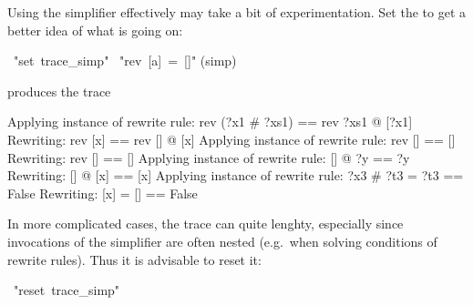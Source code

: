 \begin{isabelle}%
%
\begin{isamarkuptext}%
Using the simplifier effectively may take a bit of experimentation.  Set the
  to get a better idea of what is going
on:%
\end{isamarkuptext}%
~{"}set~trace\_simp{"}\isanewline
{}~{"}rev~[a]~=~[]{"}\isanewline
{}(simp)%
\begin{isamarkuptxt}%
\noindent
produces the trace

\begin{ttbox}
Applying instance of rewrite rule:
rev (?x1 \# ?xs1) == rev ?xs1 @ [?x1]
Rewriting:
rev [x] == rev [] @ [x]
Applying instance of rewrite rule:
rev [] == []
Rewriting:
rev [] == []
Applying instance of rewrite rule:
[] @ ?y == ?y
Rewriting:
[] @ [x] == [x]
Applying instance of rewrite rule:
?x3 \# ?t3 = ?t3 == False
Rewriting:
[x] = [] == False
\end{ttbox}

In more complicated cases, the trace can quite lenghty, especially since
invocations of the simplifier are often nested (e.g.\ when solving conditions
of rewrite rules). Thus it is advisable to reset it:%
\end{isamarkuptxt}%
~{"}reset~trace\_simp{"}\isanewline
\end{isabelle}%
